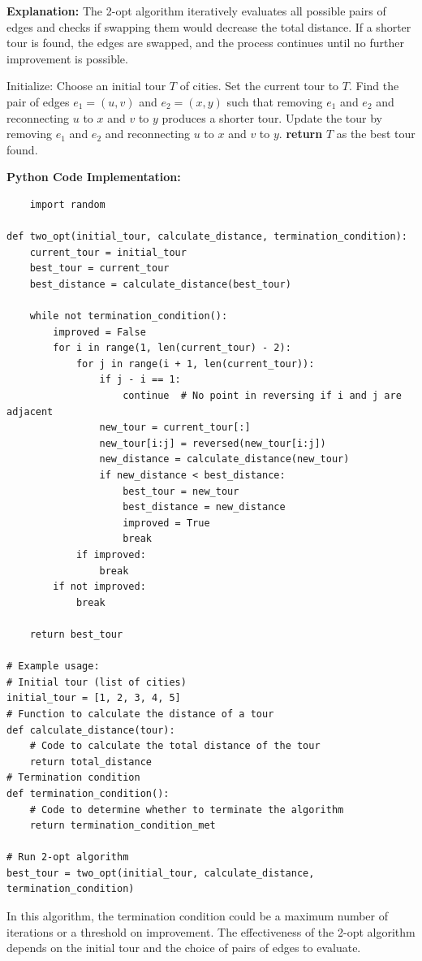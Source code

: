 \documentclass[12pt]{book} %
\begin{document}
\textbf{Explanation:} The 2-opt algorithm iteratively evaluates all possible pairs of edges and checks if swapping them would decrease the total distance. If a shorter tour is found, the edges are swapped, and the process continues until no further improvement is possible.
\FloatBarrier
\begin{algorithm}[H]
\caption{2-opt Algorithm for TSP}
\begin{algorithmic}[1]
\State Initialize: Choose an initial tour \(T\) of cities.
\State Set the current tour to \(T\).
    \State Find the pair of edges \(e_1 = (u,v)\) and \(e_2 = (x,y)\) such that removing \(e_1\) and \(e_2\) and reconnecting \(u\) to \(x\) and \(v\) to \(y\) produces a shorter tour.
        \State Update the tour by removing \(e_1\) and \(e_2\) and reconnecting \(u\) to \(x\) and \(v\) to \(y\).
    \EndIf
\EndWhile
\State \textbf{return} \(T\) as the best tour found.
\end{algorithmic}
\end{algorithm}
\FloatBarrier
\textbf{Python Code Implementation:}
\FloatBarrier
\begin{lstlisting}
    import random

def two_opt(initial_tour, calculate_distance, termination_condition):
    current_tour = initial_tour
    best_tour = current_tour
    best_distance = calculate_distance(best_tour)

    while not termination_condition():
        improved = False
        for i in range(1, len(current_tour) - 2):
            for j in range(i + 1, len(current_tour)):
                if j - i == 1:
                    continue  # No point in reversing if i and j are adjacent
                new_tour = current_tour[:]
                new_tour[i:j] = reversed(new_tour[i:j])
                new_distance = calculate_distance(new_tour)
                if new_distance < best_distance:
                    best_tour = new_tour
                    best_distance = new_distance
                    improved = True
                    break
            if improved:
                break
        if not improved:
            break

    return best_tour

# Example usage:
# Initial tour (list of cities)
initial_tour = [1, 2, 3, 4, 5]
# Function to calculate the distance of a tour
def calculate_distance(tour):
    # Code to calculate the total distance of the tour
    return total_distance
# Termination condition
def termination_condition():
    # Code to determine whether to terminate the algorithm
    return termination_condition_met

# Run 2-opt algorithm
best_tour = two_opt(initial_tour, calculate_distance, termination_condition)
\end{lstlisting}
\FloatBarrier
In this algorithm, the termination condition could be a maximum number of iterations or a threshold on improvement. The effectiveness of the 2-opt algorithm depends on the initial tour and the choice of pairs of edges to evaluate.
\end{document}
